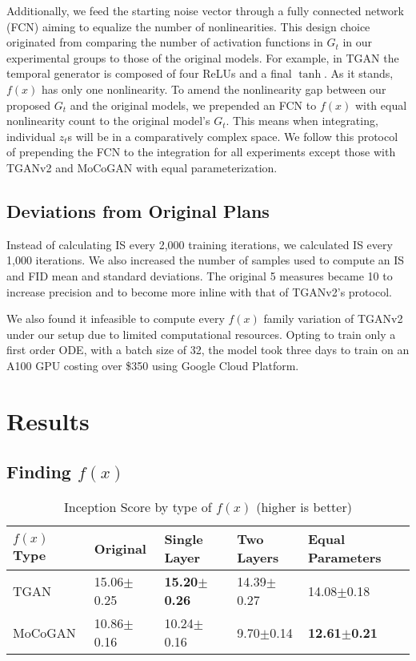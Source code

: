 \documentclass[tablecaption=bottom,pmlr]{jmlr}
\begin{document}
Additionally, we feed the starting noise vector through a fully connected network (FCN) aiming to equalize the number of nonlinearities. This design choice originated from comparing the number of activation functions in $G_t$ in our experimental groups to those of the original models. For example, in TGAN the temporal generator is composed of four ReLUs and a final $\tanh$. As it stands, $f(x)$ has only one nonlinearity. To amend the nonlinearity gap between our proposed $G_t$ and the original models, we prepended an FCN to $f(x)$ with equal nonlinearity count to the original model's $G_t$. This means when integrating, individual $z_t$s will be in a comparatively complex space. We follow this protocol of prepending the FCN to the integration for all experiments except those with TGANv2 and MoCoGAN with equal parameterization. 

\subsection{Deviations from Original Plans}

Instead of calculating IS every 2,000 training iterations, we calculated IS every 1,000 iterations. We also increased the number of samples used to compute an IS and FID mean and standard deviations. The original 5 measures became 10 to increase precision and to become more inline with that of TGANv2's protocol. 

We also found it infeasible to compute every $f(x)$ family variation of TGANv2 under our setup due to limited computational resources. Opting to train only a first order ODE, with a batch size of 32, the model took three days to train on an A100 GPU costing over \$350 using Google Cloud Platform. 

\section{Results}

\subsection[Finding F(x)]{Finding $f(x)$}
\label{sec:finding_fx}

\begin{table}[hbtp]
\centering
\begin{tabular}{lllll}
$f(x)$ Type & Original & Single Layer & Two Layers & Equal Parameters \\ \toprule
TGAN        &15.06$\pm$0.25&\textbf{15.20$\pm$0.26}&14.39$\pm$0.27&14.08$\pm$0.18\\ \midrule
MoCoGAN     &10.86$\pm$0.16&10.24$\pm$0.16&9.70$\pm$0.14&\textbf{12.61$\pm$0.21} \\ \bottomrule
\end{tabular}
\caption{Inception Score by type of $f(x)$ (higher is better)}
\label{tab:func_is}
\end{table}
\end{document}
